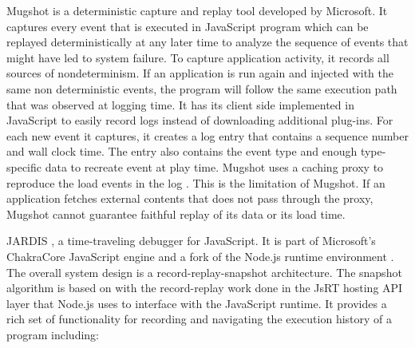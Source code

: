 \documentclass[12pt,journal]{IEEEtran}
\begin{document}
\par
Mugshot \cite{Mickens:2010:MDC:1855711.1855722} is a deterministic capture and replay tool developed by Microsoft. It captures every event that is executed in JavaScript program which can be replayed deterministically at any later time to analyze the sequence of events that might have led to system failure. To capture application activity, it records all sources of nondeterminism. If an application is run again and injected with the same non deterministic events, the program will follow the same execution path that was observed at logging time. It has its client side implemented in JavaScript to easily record logs instead of downloading additional plug-ins. For each new event it captures, it creates a log entry that contains a sequence number and wall clock time. The entry also contains the event type and enough type-specific data to recreate event at play time. Mugshot uses a caching proxy to reproduce the load events in the log . This is the limitation of Mugshot. If an application fetches external contents that does not pass through the proxy, Mugshot cannot guarantee faithful replay of its data or its load time.

\par
JARDIS \cite{paperA}, a time-traveling debugger for JavaScript. It is part of Microsoft’s ChakraCore JavaScript engine and a fork of the Node.js runtime environment . The overall system design is a record-replay-snapshot architecture. The snapshot algorithm is based on \cite{paperB} with the record-replay work done in the JsRT hosting API layer  that Node.js uses to interface with the JavaScript runtime. 
It provides a rich set of functionality for recording and navigating the execution history of a program including: \\
\end{document}
